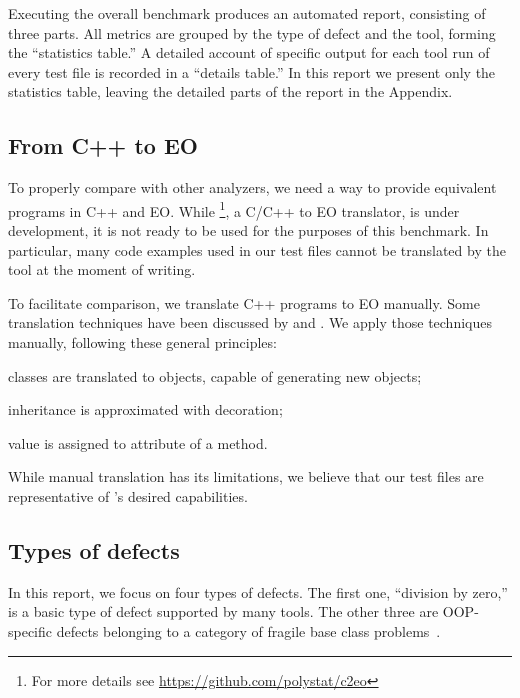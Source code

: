 Executing the overall benchmark produces an automated report, consisting of three parts. All metrics are grouped by the type of defect and the tool, forming the ``statistics table.'' A detailed account of specific output for each tool run of every test file is recorded in a ``details table.'' In this report we present only the statistics table, leaving the detailed parts of the report in the Appendix.


\subsection{From C++ to EO}

To properly compare \polystat{} with other analyzers, we need a way to provide equivalent programs in C++ and EO. While \footnote{For more details see \url{https://github.com/polystat/c2eo}}, a C/C++ to EO translator, is under development, it is not ready to be used for the purposes of this benchmark. In particular, many code examples used in our test files cannot be translated by the tool at the moment of writing.

To facilitate comparison, we translate C++ programs to EO manually. Some translation techniques have been discussed by \citet{bugayenko2021reducing} and \citet[Section 2]{KudasovShilovStepanov2021}. We apply those techniques manually, following these general principles:
\begin{inparaenum}[a)]
    \item classes are translated to objects, capable of generating new objects;
    \item inheritance is approximated with decoration;
    \item {} value is assigned to  attribute of a method.
\end{inparaenum}

While manual translation has its limitations, we believe that our test files are representative of \polystat{}'s desired capabilities.

\subsection{Types of defects}
\label{sec:types}
In this report, we focus on four types of defects. The first one, ``division by zero,'' is a basic type of defect supported by many tools. The other three are OOP-specific defects belonging to a category of fragile base class problems~\citep{MikhajlovSekerinski1998}.

